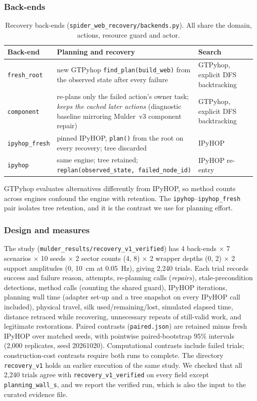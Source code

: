 \subsubsection{Back-ends}
\begin{table}[H]
\centering
\caption{Recovery back-ends (\texttt{spider\_web\_recovery/backends.py}). All share the domain, actions,
resource guard and actor.}
\label{tab:recovery-backends}
\small
\begin{tabularx}{\linewidth}{@{}l>{\raggedright\arraybackslash}Xl@{}}
\toprule
Back-end & Planning and recovery & Search \\
\midrule
\texttt{fresh\_root} & new GTPyhop \texttt{find\_plan(build\_web)} from the observed state after every failure & GTPyhop, explicit DFS backtracking \\
\texttt{component} & re-plans only the failed action's owner task; \emph{keeps the cached later actions} (diagnostic baseline mirroring Mulder~v3 component repair) & GTPyhop, explicit DFS backtracking \\
\texttt{ipyhop\_fresh} & pinned IPyHOP, \texttt{plan()} from the root on every recovery; tree discarded & IPyHOP \\
\texttt{ipyhop} & same engine; tree retained; \texttt{replan(observed\_state, failed\_node\_id)} & IPyHOP re-entry \\
\bottomrule
\end{tabularx}
\end{table}
\noindent GTPyhop evaluates alternatives differently from IPyHOP, so method counts across engines confound
the engine with retention. The \texttt{ipyhop}--\texttt{ipyhop\_fresh} pair isolates tree retention, and
it is the contrast we use for planning effort.

\subsubsection{Design and measures}
The study (\texttt{mulder\_results/recovery\_v1\_verified}) has 4 back-ends $\times$ 7 scenarios $\times$
10 seeds $\times$ 2 sector counts (4, 8) $\times$ 2 wrapper depths (0, 2) $\times$ 2 support amplitudes
(0, 10~cm at 0.05~Hz), giving 2,240 trials. Each trial records success and failure reason, attempts,
re-planning calls (\emph{repairs}), stale-precondition detections, method calls (counting the shared
guard), IPyHOP iterations, planning wall time (adapter set-up and a tree snapshot on every IPyHOP call
included), physical travel, silk used/remaining/lost, simulated elapsed time, distance retraced while
recovering, unnecessary repeats of still-valid work, and legitimate restorations. Paired contrasts
(\texttt{paired.json}) are retained minus fresh IPyHOP over matched seeds, with pointwise paired-bootstrap
95\% intervals (2,000 replicates, seed 20261020). Computational contrasts include failed trials;
construction-cost contrasts require both runs to complete. The directory \texttt{recovery\_v1} holds an
earlier execution of the same study. We checked that all 2,240 trials agree with
\texttt{recovery\_v1\_verified} on every field except \texttt{planning\_wall\_s}, and we report the
verified run, which is also the input to the curated evidence file.

